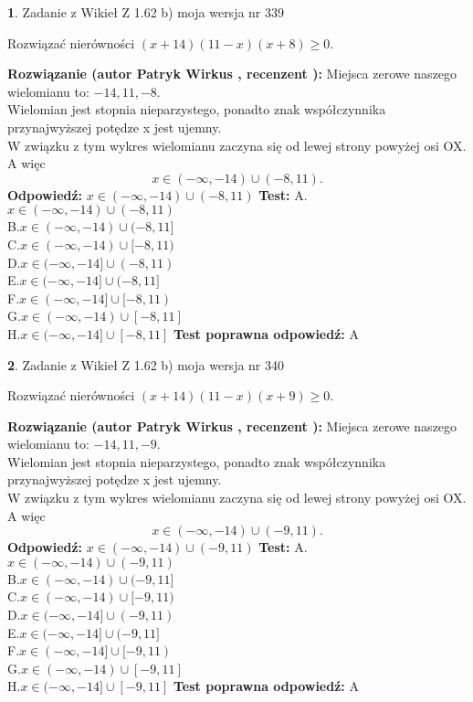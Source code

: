 \documentclass[12pt, a4paper]{article}
\theoremstyle{definition} %
\newtheorem{zad}{}
\newcommand{\zadStart}[1]{\begin{zad}#1\newline}
\newcommand{\zadStop}{\end{zad}}
\newcommand{\rozwStart}[2]{\noindent \textbf{Rozwiązanie (autor #1 , recenzent #2): }\newline}
\newcommand{\rozwStop}{\newline}
\newcommand{\odpStart}{\noindent \textbf{Odpowiedź:}\newline}
\newcommand{\odpStop}{\newline}
\newcommand{\testStart}{\noindent \textbf{Test:}\newline}
\newcommand{\testStop}{\newline}
\newcommand{\kluczStart}{\noindent \textbf{Test poprawna odpowiedź:}\newline}
\newcommand{\kluczStop}{\newline}
\begin{document}
\zadStart{Zadanie z Wikieł Z 1.62 b) moja wersja nr 339}

Rozwiązać nierówności $(x+14)(11-x)(x+8)\ge0$.
\zadStop
\rozwStart{Patryk Wirkus}{}
Miejsca zerowe naszego wielomianu to: $-14, 11, -8$.\\
Wielomian jest stopnia nieparzystego, ponadto znak współczynnika przy\linebreak najwyższej potędze x jest ujemny.\\ W związku z tym wykres wielomianu zaczyna się od lewej strony powyżej osi OX. A więc $$x \in (-\infty,-14) \cup (-8,11).$$
\rozwStop
\odpStart
$x \in (-\infty,-14) \cup (-8,11)$
\odpStop
\testStart
A.$x \in (-\infty,-14) \cup (-8,11)$\\
B.$x \in (-\infty,-14) \cup (-8,11]$\\
C.$x \in (-\infty,-14) \cup [-8,11)$\\
D.$x \in (-\infty,-14] \cup (-8,11)$\\
E.$x \in (-\infty,-14] \cup (-8,11]$\\
F.$x \in (-\infty,-14] \cup [-8,11)$\\
G.$x \in (-\infty,-14) \cup [-8,11]$\\
H.$x \in (-\infty,-14] \cup [-8,11]$
\testStop
\kluczStart
A
\kluczStop



\zadStart{Zadanie z Wikieł Z 1.62 b) moja wersja nr 340}

Rozwiązać nierówności $(x+14)(11-x)(x+9)\ge0$.
\zadStop
\rozwStart{Patryk Wirkus}{}
Miejsca zerowe naszego wielomianu to: $-14, 11, -9$.\\
Wielomian jest stopnia nieparzystego, ponadto znak współczynnika przy\linebreak najwyższej potędze x jest ujemny.\\ W związku z tym wykres wielomianu zaczyna się od lewej strony powyżej osi OX. A więc $$x \in (-\infty,-14) \cup (-9,11).$$
\rozwStop
\odpStart
$x \in (-\infty,-14) \cup (-9,11)$
\odpStop
\testStart
A.$x \in (-\infty,-14) \cup (-9,11)$\\
B.$x \in (-\infty,-14) \cup (-9,11]$\\
C.$x \in (-\infty,-14) \cup [-9,11)$\\
D.$x \in (-\infty,-14] \cup (-9,11)$\\
E.$x \in (-\infty,-14] \cup (-9,11]$\\
F.$x \in (-\infty,-14] \cup [-9,11)$\\
G.$x \in (-\infty,-14) \cup [-9,11]$\\
H.$x \in (-\infty,-14] \cup [-9,11]$
\testStop
\kluczStart
A
\kluczStop
\end{document}
